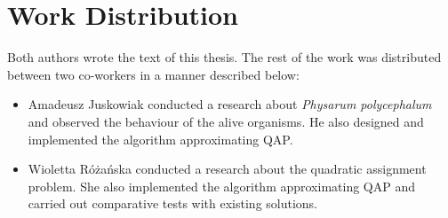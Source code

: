 \section*{Work Distribution}
\label{section:introduction_distribution}

Both authors wrote the text of this thesis. The rest of the work was distributed between two co-workers in a manner described below:
\begin{itemize}
  \item Amadeusz Juskowiak conducted a research about \textit{Physarum polycephalum} and observed the behaviour of the alive organisms. He also designed and implemented the algorithm approximating QAP.
  \item Wioletta Różańska conducted a research about the quadratic assignment problem. She also implemented the algorithm approximating QAP and carried out comparative tests with existing solutions.
\end{itemize}
